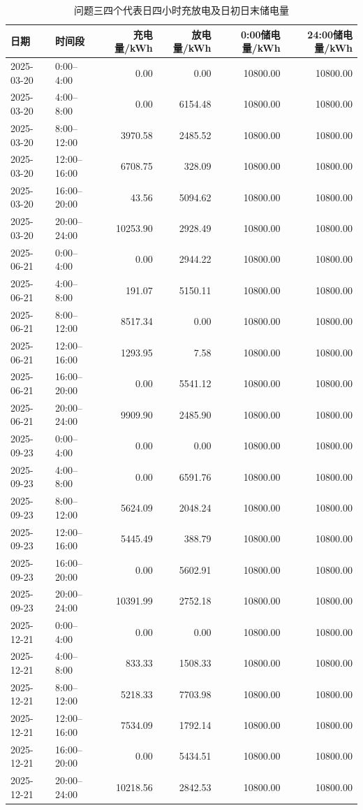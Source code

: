 \documentclass[UTF8,12pt,a4paper]{ctexart}
\theoremstyle{remark}
\begin{document}
\begin{table}[H]\centering\scriptsize
\caption{问题三四个代表日四小时充放电及日初日末储电量}\label{tab:q3-blocks}
\begin{tabular}{llrrrr}\toprule 日期&时间段&充电量/kWh&放电量/kWh&0:00储电量/kWh&24:00储电量/kWh\\\midrule
2025-03-20&0:00--4:00&0.00&0.00&10800.00&10800.00\\
2025-03-20&4:00--8:00&0.00&6154.48&10800.00&10800.00\\
2025-03-20&8:00--12:00&3970.58&2485.52&10800.00&10800.00\\
2025-03-20&12:00--16:00&6708.75&328.09&10800.00&10800.00\\
2025-03-20&16:00--20:00&43.56&5094.62&10800.00&10800.00\\
2025-03-20&20:00--24:00&10253.90&2928.49&10800.00&10800.00\\
2025-06-21&0:00--4:00&0.00&2944.22&10800.00&10800.00\\
2025-06-21&4:00--8:00&191.07&5150.11&10800.00&10800.00\\
2025-06-21&8:00--12:00&8517.34&0.00&10800.00&10800.00\\
2025-06-21&12:00--16:00&1293.95&7.58&10800.00&10800.00\\
2025-06-21&16:00--20:00&0.00&5541.12&10800.00&10800.00\\
2025-06-21&20:00--24:00&9909.90&2485.90&10800.00&10800.00\\
2025-09-23&0:00--4:00&0.00&0.00&10800.00&10800.00\\
2025-09-23&4:00--8:00&0.00&6591.76&10800.00&10800.00\\
2025-09-23&8:00--12:00&5624.09&2048.24&10800.00&10800.00\\
2025-09-23&12:00--16:00&5445.49&388.79&10800.00&10800.00\\
2025-09-23&16:00--20:00&0.00&5602.91&10800.00&10800.00\\
2025-09-23&20:00--24:00&10391.99&2752.18&10800.00&10800.00\\
2025-12-21&0:00--4:00&0.00&0.00&10800.00&10800.00\\
2025-12-21&4:00--8:00&833.33&1508.33&10800.00&10800.00\\
2025-12-21&8:00--12:00&5218.33&7703.98&10800.00&10800.00\\
2025-12-21&12:00--16:00&7534.09&1792.14&10800.00&10800.00\\
2025-12-21&16:00--20:00&0.00&5434.51&10800.00&10800.00\\
2025-12-21&20:00--24:00&10218.56&2842.53&10800.00&10800.00\\\bottomrule
\end{tabular}\end{table}
\end{document}
